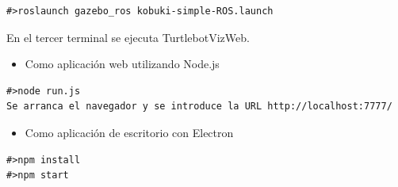 \begin{lstlisting}[caption= Ejecución del driver de ROS label=cod.gazeboturtle]
#>roslaunch gazebo_ros kobuki-simple-ROS.launch
\end{lstlisting}

En el tercer terminal se ejecuta TurtlebotVizWeb.

\begin{itemize}
\item 
Como aplicación web utilizando Node.js
\end{itemize}
\begin{lstlisting}[caption= Ejecución con Node.js, label=cod.turtlenodejs]
#>node run.js
Se arranca el navegador y se introduce la URL http://localhost:7777/
\end{lstlisting}
\begin{itemize}
\item 
Como aplicación de escritorio con Electron
\end{itemize}
\begin{lstlisting}[caption= Ejecución con Electron, label=cod.turtleelectron]
#>npm install
#>npm start
\end{lstlisting}

